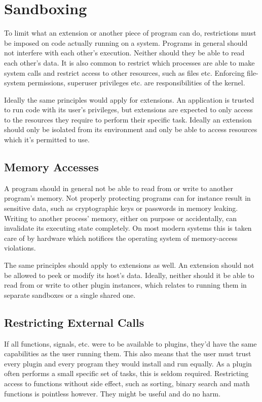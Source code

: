 \chapter {Sandboxing}

To limit what an extension or another piece of program can do, restrictions
must be imposed on code actually running on a system. Programs in general
should not interfere with each other's execution. Neither should they be able
to read each other's data. It is also common to restrict which processes are
able to make system calls and restrict access to other resources, such as files
etc. Enforcing file-system permissions, superuser privileges etc. are
responsibilities of the kernel.

Ideally the same principles would apply for extensions. An application is
trusted to run code with its user's privileges, but extensions are expected to
only access to the resources they require to perform their specific task.
Ideally an extension should only be isolated from its environment and only be
able to access resources which it's permitted to use.

\section {Memory Accesses}

A program should in general not be able to read from or write to another
program's memory. Not properly protecting programs can for instance result in
sensitive data, such as cryptographic keys or passwords in memory leaking.
Writing to another process' memory, either on purpose or accidentally, can
invalidate its executing state completely. On most modern systems this is taken
care of by hardware which notifices the operating system of memory-access
violations.

The same principles should apply to extensions as well. An extension should not
be allowed to peek or modify its host's data. Ideally, neither should it be
able to read from or write to other plugin instances, which relates to running
them in separate sandboxes or a single shared one.

\section {Restricting External Calls}

If all functions, signals, etc. were to be available to plugins, they'd have the
same capabilities as the user running them. This also means that the user must
trust every plugin and every program they would install and run equally. As a
plugin often performs a small specific set of tasks, this is seldom required.
Restricting access to functions without side effect, such as sorting, binary
search and math functions is pointless however. They might be useful and do no
harm.


